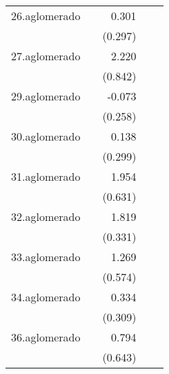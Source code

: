 {\begin{longtable}{l*{4}{D{.}{.}{-1}}}
\addlinespace
26.aglomerado&                     &       0.301         &                     &                     \\
            &                     &     (0.297)         &                     &                     \\
\addlinespace
27.aglomerado&                     &       2.220\sym{**} &                     &                     \\
            &                     &     (0.842)         &                     &                     \\
\addlinespace
29.aglomerado&                     &      -0.073         &                     &                     \\
            &                     &     (0.258)         &                     &                     \\
\addlinespace
30.aglomerado&                     &       0.138         &                     &                     \\
            &                     &     (0.299)         &                     &                     \\
\addlinespace
31.aglomerado&                     &       1.954\sym{**} &                     &                     \\
            &                     &     (0.631)         &                     &                     \\
\addlinespace
32.aglomerado&                     &       1.819\sym{***}&                     &                     \\
            &                     &     (0.331)         &                     &                     \\
\addlinespace
33.aglomerado&                     &       1.269\sym{*}  &                     &                     \\
            &                     &     (0.574)         &                     &                     \\
\addlinespace
34.aglomerado&                     &       0.334         &                     &                     \\
            &                     &     (0.309)         &                     &                     \\
\addlinespace
36.aglomerado&                     &       0.794         &                     &                     \\
            &                     &     (0.643)         &                     &                     \\

\end{longtable}}
